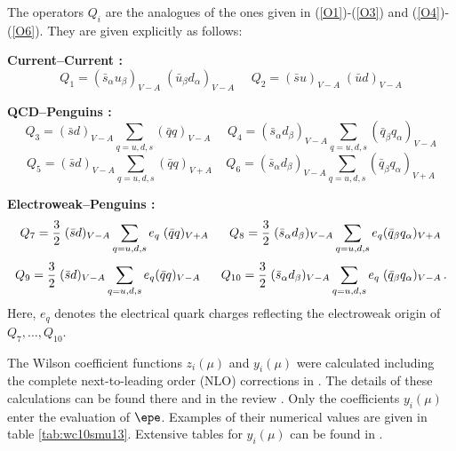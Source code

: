 The operators $Q_i$ are the analogues of the ones given in 
(\ref{O1})-(\ref{O3}) and (\ref{O4})-(\ref{O6}).
They are given explicitly  as follows:

{\bf Current--Current :}
\begin{equation}\label{OS1} 
Q_1 = (\bar s_{\alpha} u_{\beta})_{V-A}\;(\bar u_{\beta} d_{\alpha})_{V-A}
~~~~~~Q_2 = (\bar s u)_{V-A}\;(\bar u d)_{V-A} 
\end{equation}

{\bf QCD--Penguins :}
\begin{equation}\label{OS2}
Q_3 = (\bar s d)_{V-A}\sum_{q=u,d,s}(\bar qq)_{V-A}~~~~~~   
 Q_4 = (\bar s_{\alpha} d_{\beta})_{V-A}\sum_{q=u,d,s}(\bar q_{\beta} 
       q_{\alpha})_{V-A} 
\end{equation}
\begin{equation}\label{OS3}
 Q_5 = (\bar s d)_{V-A} \sum_{q=u,d,s}(\bar qq)_{V+A}~~~~~  
 Q_6 = (\bar s_{\alpha} d_{\beta})_{V-A}\sum_{q=u,d,s}
       (\bar q_{\beta} q_{\alpha})_{V+A} 
\end{equation}

{\bf Electroweak--Penguins :}
\begin{equation}\label{OS4} 
Q_7 = {3\over 2}\;(\bar s d)_{V-A}\sum_{q=u,d,s}e_q\;(\bar qq)_{V+A} 
~~~~~ Q_8 = {3\over2}\;(\bar s_{\alpha} d_{\beta})_{V-A}\sum_{q=u,d,s}e_q
        (\bar q_{\beta} q_{\alpha})_{V+A}
\end{equation}
\begin{equation}\label{OS5} 
 Q_9 = {3\over 2}\;(\bar s d)_{V-A}\sum_{q=u,d,s}e_q(\bar q q)_{V-A}
~~~~~Q_{10} ={3\over 2}\;
(\bar s_{\alpha} d_{\beta})_{V-A}\sum_{q=u,d,s}e_q\;
       (\bar q_{\beta}q_{\alpha})_{V-A} \,.
\end{equation}
Here, $e_q$ denotes the electrical quark charges reflecting the
electroweak origin of $Q_7,\ldots,Q_{10}$. 

The Wilson coefficient functions $z_i(\mu)$ and $ y_i(\mu)$
were calculated including
the complete next-to-leading order (NLO) corrections in
\cite{BJLW1,BJLW2,BJLW,ROMA1,ROMA2}. The details
of these calculations can be found there and in the review
\cite{BBL}. Only the coefficients $ y_i(\mu)$ enter the evaluation
of $\epe$. Examples of their numerical values are given in table 
\ref{tab:wc10smu13}.
Extensive tables for $ y_i(\mu)$ can be found in \cite{BBL}.

